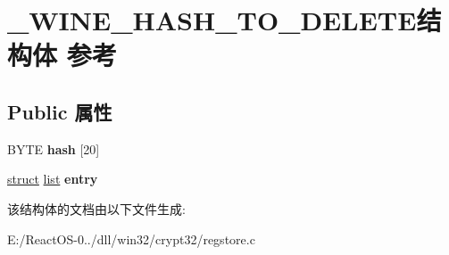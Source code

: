 \hypertarget{struct___w_i_n_e___h_a_s_h___t_o___d_e_l_e_t_e}{}\section{\+\_\+\+W\+I\+N\+E\+\_\+\+H\+A\+S\+H\+\_\+\+T\+O\+\_\+\+D\+E\+L\+E\+T\+E结构体 参考}
\label{struct___w_i_n_e___h_a_s_h___t_o___d_e_l_e_t_e}
\subsection*{Public 属性}
\begin{DoxyCompactItemize}
\item 
\mbox{\label{struct___w_i_n_e___h_a_s_h___t_o___d_e_l_e_t_e_a1f67d94a4ea68748fb18a7cc980568ba}} 
B\+Y\+TE {\bfseries hash} \mbox{[}20\mbox{]}
\item 
\mbox{\label{struct___w_i_n_e___h_a_s_h___t_o___d_e_l_e_t_e_aff7efb5f278def389231ba579a48333f}} 
\hyperlink{interfacestruct}{struct} \hyperlink{classlist}{list} {\bfseries entry}
\end{DoxyCompactItemize}


该结构体的文档由以下文件生成\+:\begin{DoxyCompactItemize}
\item 
E\+:/\+React\+O\+S-\/0../dll/win32/crypt32/regstore.\+c\end{DoxyCompactItemize}
